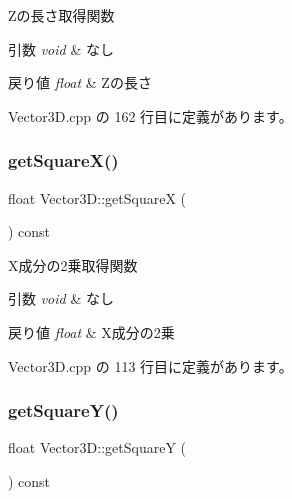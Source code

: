 Zの長さ取得関数 


\begin{DoxyParams}{引数}
{\em void} & なし \\
\hline
\end{DoxyParams}

\begin{DoxyRetVals}{戻り値}
{\em float} & Zの長さ \\
\hline
\end{DoxyRetVals}


 Vector3\+D.\+cpp の 162 行目に定義があります。

\mbox{\label{class_vector3_d_a36067a5027567b47c11eae8f1fc5be82}} 
\subsubsection{\texorpdfstring{get\+Square\+X()}{getSquareX()}}
{\footnotesize\ttfamily float Vector3\+D\+::get\+SquareX (\begin{DoxyParamCaption}{ }\end{DoxyParamCaption}) const}



X成分の2乗取得関数 


\begin{DoxyParams}{引数}
{\em void} & なし \\
\hline
\end{DoxyParams}

\begin{DoxyRetVals}{戻り値}
{\em float} & X成分の2乗 \\
\hline
\end{DoxyRetVals}


 Vector3\+D.\+cpp の 113 行目に定義があります。

\mbox{\label{class_vector3_d_a367f48b718d547de44789f1bedfa57a5}} 
\subsubsection{\texorpdfstring{get\+Square\+Y()}{getSquareY()}}
{\footnotesize\ttfamily float Vector3\+D\+::get\+SquareY (\begin{DoxyParamCaption}{ }\end{DoxyParamCaption}) const}



